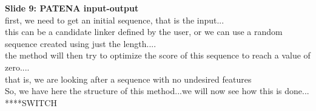 \documentclass[a4paper,10pt]{article}
\begin{document}
\textbf{Slide 9: PATENA input-output}\\
first, we need to get an initial sequence, that is the input... \\
this can be a candidate linker defined by the user, or we can use a random sequence created using just the length....\\
the method will then try to optimize the score of this sequence to reach a value of zero....\\
that is, we are looking after a sequence with no undesired features\\
So, we have here the structure of this method...we will now see how this is done... ****SWITCH\\
\end{document}
